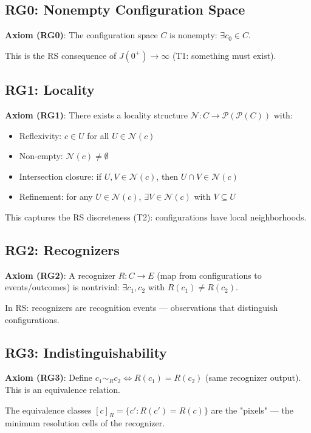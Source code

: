 \documentclass[12pt,a4paper]{article}
\theoremstyle{definition}
\theoremstyle{remark}
\begin{document}
\subsection{RG0: Nonempty Configuration Space}

\textbf{Axiom (RG0)}: The configuration space $C$ is nonempty: $\exists c_0 \in C$.

This is the RS consequence of $J(0^+) \to \infty$ (T1: something must exist).

\subsection{RG1: Locality}

\textbf{Axiom (RG1)}: There exists a locality structure $\mathcal{N}: C \to \mathcal{P}(\mathcal{P}(C))$ 
with:
\begin{itemize}
\item Reflexivity: $c \in U$ for all $U \in \mathcal{N}(c)$
\item Non-empty: $\mathcal{N}(c) \neq \emptyset$
\item Intersection closure: if $U, V \in \mathcal{N}(c)$, then $U \cap V \in \mathcal{N}(c)$
\item Refinement: for any $U \in \mathcal{N}(c)$, $\exists V \in \mathcal{N}(c)$ with $V \subseteq U$
\end{itemize}

This captures the RS discreteness (T2): configurations have local neighborhoods.

\subsection{RG2: Recognizers}

\textbf{Axiom (RG2)}: A recognizer $R: C \to E$ (map from configurations to events/outcomes) 
is nontrivial: $\exists c_1, c_2$ with $R(c_1) \neq R(c_2)$.

In RS: recognizers are recognition events — observations that distinguish configurations.

\subsection{RG3: Indistinguishability}

\textbf{Axiom (RG3)}: Define $c_1 \sim_R c_2 \iff R(c_1) = R(c_2)$ 
(same recognizer output). This is an equivalence relation.

The equivalence classes $[c]_R = \{c' : R(c') = R(c)\}$ are the "pixels" — 
the minimum resolution cells of the recognizer.
\end{document}
